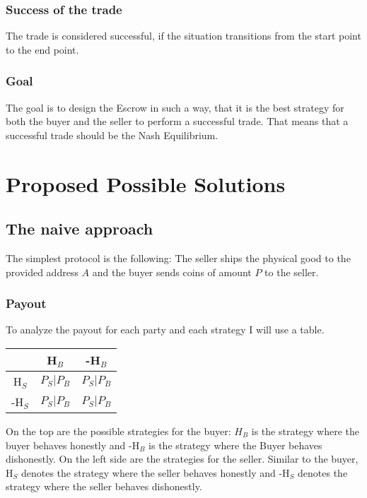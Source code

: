 \documentclass{cacthesis}
\begin{document}
\subsection{Success of the trade}
The trade is considered successful, if the situation transitions from the start point to the end point.

\subsection{Goal}
The goal is to design the Escrow in such a way, that it is the best strategy for both the buyer and the seller to perform a successful trade. That means that a successful trade should be the Nash Equilibrium.


\chapter{Proposed Possible Solutions}
\section{The naive approach}
The simplest protocol is the following: The seller ships the physical good to the provided address $A$ and the buyer sends coins of amount $P$ to the seller.  
\subsection{Payout}
To analyze the payout for each party and each strategy I will use a table.\newline

\begin{center}
\begin{tabular}{ c||c|c| }
& H$_B$ & -H$_B$  \\
\hline
\hline
H$_S$ & $P_S | P_B$ & $P_S | P_B$ \\
\hline
-H$_S$ & $P_S | P_B$ & $P_S | P_B$ \\ 
\hline
\end{tabular}
\end{center}

 On the top are the possible strategies for the buyer: $H_B$ is the strategy where the buyer behaves honestly and -H$_B$ is the strategy where the Buyer behaves dishonestly.\newline
On the left side are the strategies for the seller. Similar to the buyer, H$_S$ denotes the strategy where the seller behaves honestly and -H$_S$ denotes the strategy where the seller behaves dishonestly.\newline
\end{document}
